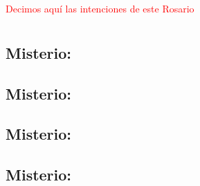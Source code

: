 \documentclass[10pt,twoside]{book}
\newcounter{joyful-counter}
\begin{document}
\vspace{2mm}

\begin{center}
      \textcolor{red}{Decimos aquí las intenciones de este Rosario}
\end{center}

\section*{}
\textcolor{red}{}
\subsection*{ Misterio: }


\begin{center}
      
\end{center}

\subsection*{ Misterio: }


\begin{center}
      
\end{center}

\subsection*{ Misterio: }


\begin{center}
      
\end{center}

\subsection*{ Misterio: }

\end{document}

